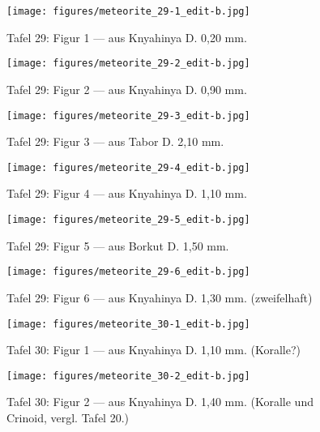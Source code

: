 \documentclass[a4paper, 11pt, oneside]{article}
\begin{document}
\clearpage
{}
\begin{figure}[t]
\texttt{[image: figures/meteorite\_29-1\_edit-b.jpg]}
\caption{Tafel 29: Figur 1 --- aus Knyahinya D. 0,20 mm.}
\centering
\end{figure}
\clearpage
\begin{figure}[t]
\texttt{[image: figures/meteorite\_29-2\_edit-b.jpg]}
\caption{Tafel 29: Figur 2 --- aus Knyahinya D. 0,90 mm.}
\centering
\end{figure}
\clearpage
\begin{figure}[t]
\texttt{[image: figures/meteorite\_29-3\_edit-b.jpg]}
\caption{Tafel 29: Figur 3 --- aus Tabor D. 2,10 mm.}
\centering
\end{figure}
\clearpage
\begin{figure}[t]
\texttt{[image: figures/meteorite\_29-4\_edit-b.jpg]}
\caption{Tafel 29: Figur 4 --- aus Knyahinya D. 1,10 mm.}
\centering
\end{figure}
\clearpage
\begin{figure}[t]
\texttt{[image: figures/meteorite\_29-5\_edit-b.jpg]}
\caption{Tafel 29: Figur 5 --- aus Borkut D. 1,50 mm.}
\centering
\end{figure}
\clearpage
\begin{figure}[t]
\texttt{[image: figures/meteorite\_29-6\_edit-b.jpg]}
\caption{Tafel 29: Figur 6 --- aus Knyahinya D. 1,30 mm. (zweifelhaft)}
\centering
\end{figure}
\clearpage
{}
\begin{figure}[t]
\texttt{[image: figures/meteorite\_30-1\_edit-b.jpg]}
\caption{Tafel 30: Figur 1 --- aus Knyahinya D. 1,10 mm. (Koralle?)}
\centering
\end{figure}
\clearpage
\begin{figure}[t]
\texttt{[image: figures/meteorite\_30-2\_edit-b.jpg]}
\caption{Tafel 30: Figur 2 --- aus Knyahinya D. 1,40 mm. (Koralle und Crinoid, vergl. Tafel 20.)}
\centering
\end{figure}
\end{document}
